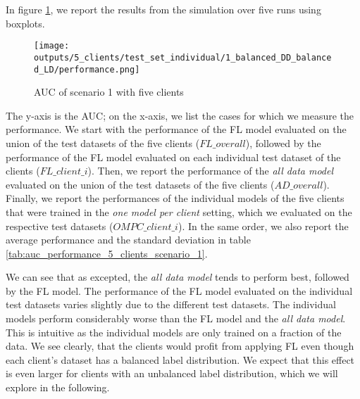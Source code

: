 In figure \ref{fig:auc_box_5_clients_scenario_1}, we report the results from the simulation over five runs using boxplots.
\begin{figure}[htb!]
    \centering
    \texttt{[image: outputs/5\_clients/test\_set\_individual/1\_balanced\_DD\_balanced\_LD/performance.png]}
    \caption{AUC of scenario 1 with five clients}
    \label{fig:auc_box_5_clients_scenario_1}
\end{figure}

The y-axis is the AUC; on the x-axis, we list the cases for which we measure the performance. We start with the performance of the FL model evaluated on the union of the test datasets of the five clients ($FL\_overall$), followed by the performance of the FL model evaluated on each individual test dataset of the clients ($FL\_client\_i$). Then, we report the performance of the \emph{all data model} evaluated on the union of the test datasets of the five clients ($AD\_overall$). Finally, we report the performances of the individual models of the five clients that were trained in the \emph{one model per client} setting, which we evaluated on the respective test datasets ($OMPC\_client\_i$). In the same order, we also report the average performance and the standard deviation in table \ref{tab:auc_performance_5_clients_scenario_1}.


We can see that as excepted, the \emph{all data model} tends to perform best, followed by the FL model. The performance of the FL model evaluated on the individual test datasets varies slightly due to the different test datasets. The individual models perform considerably worse than the FL model and the \emph{all data model}. This is intuitive as the individual models are only trained on a fraction of the data. We see clearly, that the clients would profit from applying FL even though each client's dataset has a balanced label distribution. We expect that this effect is even larger for clients with an unbalanced label distribution, which we will explore in the following.

